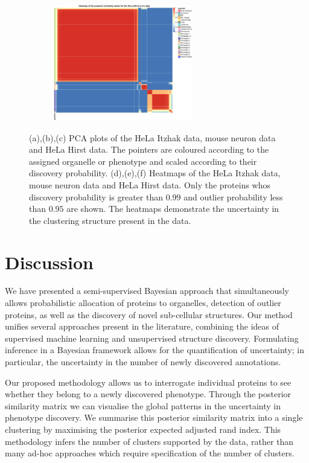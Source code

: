 \documentclass[12pt,english]{article}
\begin{document}
\begin{figure}
	\begin{subfigure}[t]{0.5\textwidth}
		\centering
		\includegraphics[height=2in]{heatmapHirst.pdf}
		\caption{}
	\end{subfigure}
	\caption{(a),(b),(c) PCA plots of the HeLa Itzhak data, mouse neuron data and HeLa Hirst data. The pointers are coloured according to the assigned organelle or phenotype and scaled according to their discovery probability. (d),(e),(f) Heatmaps of the HeLa Itzhak data, mouse neuron data and HeLa Hirst data. Only the proteins whos discovery probability is greater than $0.99$ and outlier probability less than $0.95$ are shown. The heatmaps demonstrate the uncertainty in the clustering structure present in the data.}
	\label{figure:DOM}
\end{figure}

\clearpage 
\section{Discussion}
We have presented a semi-supervised Bayesian approach that simultaneously allows probabilistic allocation of proteins to organelles, detection of outlier proteins, as well as the discovery of novel sub-cellular structures. Our method unifies several approaches present in the literature, combining the ideas of supervised machine learning and unsupervised structure discovery. Formulating inference in a Bayesian framework allows for the quantification of uncertainty; in particular, the uncertainty in the number of newly discovered annotations.

Our proposed methodology allows us to interrogate individual proteins to see whether they belong to a newly discovered phenotype. Through the posterior similarity matrix we can visualise the global patterns in the uncertainty in phenotype discovery. We summarise this posterior similarity matrix into a single clustering by maximising the posterior expected adjusted rand index. This methodology infers the number of clusters supported by the data, rather than many ad-hoc approaches which require specification of the number of clusters.
\end{document}
